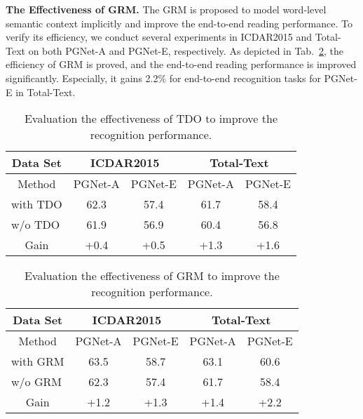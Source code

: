 \documentclass[letterpaper]{article} \usepackage{aaai21}  \usepackage{times}  \usepackage{helvet} \usepackage{courier}  \usepackage[hyphens]{url}  \usepackage{graphicx} \urlstyle{rm} \def\UrlFont{\rm}  \usepackage{natbib}  \usepackage{caption} \usepackage{bm}
\begin{document}
\textbf{The Effectiveness of GRM.} The GRM is proposed to model word-level semantic context implicitly and improve the end-to-end reading performance. To verify its efficiency, we conduct several experiments in ICDAR2015 and Total-Text on both PGNet-A and PGNet-E, respectively. As depicted in Tab.~\ref{tab:ab_grm}, the efficiency of GRM is proved, and the end-to-end reading performance is improved significantly. Especially, it gains 2.2\% for end-to-end recognition tasks for PGNet-E in Total-Text.

\begin{table}[]
    \centering
    \tabcolsep=4pt\relax
    \begin{tabular}{c|c|c|c|c}
    \hline
    Data Set                            & \multicolumn{2}{c|}{ICDAR2015} & \multicolumn{2}{c}{Total-Text}\\
    \hline
    Method                              & PGNet-A        & PGNet-E       & PGNet-A        & PGNet-E\\
    \hline
    \multicolumn{1}{l|}{with TDO}       & 62.3           & 57.4          & 61.7           & 58.4\\
    \multicolumn{1}{l|}{w/o TDO}        & 61.9           & 56.9          & 60.4           & 56.8\\
    \hline
    Gain                                & +0.4           & +0.5          & +1.3           & +1.6\\
    \hline
    \end{tabular}
    \caption{Evaluation the effectiveness of TDO to improve the recognition performance.}
    \label{tab:ab_tdo}
\end{table} 

\begin{table}[]
    \centering
    \tabcolsep=4pt\relax
    \begin{tabular}{c|c|c|c|c}
    \hline
    Data Set                            & \multicolumn{2}{c|}{ICDAR2015} & \multicolumn{2}{c}{Total-Text} \\ \hline
    Method                              & PGNet-A        & PGNet-E       & PGNet-A        & PGNet-E       \\ \hline
    \multicolumn{1}{l|}{with GRM}       & 63.5           & 58.7          & 63.1           & 60.6          \\
    \multicolumn{1}{l|}{w/o GRM}        & 62.3           & 57.4          & 61.7           & 58.4          \\ \hline
    Gain                                & +1.2           & +1.3          & +1.4           & +2.2          \\ \hline
    \end{tabular}
    \caption{Evaluation the effectiveness of GRM to improve the recognition performance.}
    \label{tab:ab_grm}
\end{table}
\end{document}
